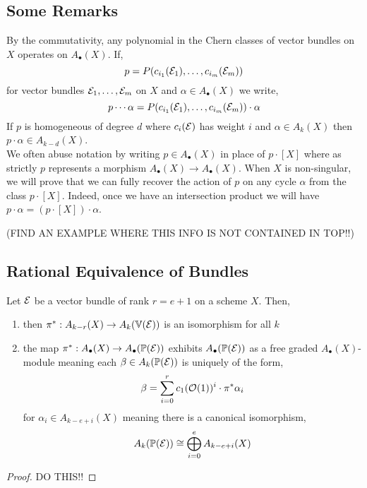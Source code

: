 \documentclass[12pt]{article}
\begin{document}
\subsection{Some Remarks}

By the commutativity, any polynomial in the Chern classes of vector bundles on $X$ operates on $A_\bullet(X)$. If,
\[ p = P(c_{i_1}(\mathcal{E}_1), \dots, c_{i_m}(\mathcal{E}_m)) \]
for vector bundles $\mathcal{E}_1, \dots, \mathcal{E}_m$ on $X$ and $\alpha \in A_\bullet(X)$ we write,
\[ p \cdots \alpha = P(c_{i_1}(\mathcal{E}_1), \dots, c_{i_m}(\mathcal{E}_m)) \cdot \alpha \]
If $p$ is homogeneous of degree $d$ where $c_i(\mathcal{E})$ has weight $i$ and $\alpha \in A_k(X)$ then $p \cdot \alpha \in A_{k-d}(X)$.
\bigskip\\
We often abuse notation by writing $p \in A_\bullet(X)$ in place of $p \cdot [X]$ where as strictly $p$ represents a morphism $A_\bullet(X) \to A_\bullet(X)$. When $X$ is non-singular, we will prove that we can fully recover the action of $p$ on any cycle $\alpha$ from the class $p \cdot [X]$. Indeed, once we have an intersection product we will have $p \cdot \alpha = (p \cdot [X]) \cdot \alpha$. 

(FIND AN EXAMPLE WHERE THIS INFO IS NOT CONTAINED IN TOP!!)

\subsection{Rational Equivalence of Bundles}

\begin{theorem}
Let $\mathcal{E}$ be a vector bundle of rank $r = e + 1$ on a scheme $X$. Then,
\begin{enumerate}
\item then $\pi^* : A_{k-r}(X) \to A_k(\mathbb{V}(\mathcal{E}))$ is an isomorphism for all $k$

\item the map $\pi^* : A_\bullet(X) \to A_\bullet(\mathbb{P}(\mathcal{E}))$ exhibits $A_\bullet(\mathbb{P}(\mathcal{E}))$ as a free graded $A_\bullet(X)$-module meaning each $\beta \in A_k(\mathbb{P}(\mathcal{E}))$ is uniquely of the form,
\[ \beta = \sum_{i = 0}^r c_1(\mathcal{O}_{}(1))^i \cdot \pi^* \alpha_i \]
for $\alpha_i \in A_{k - e + i}(X)$ meaning there is a canonical isomorphism,
\[ A_k(\mathbb{P}(\mathcal{E})) \cong \bigoplus_{i = 0}^e A_{k-e+i}(X) \]
\end{enumerate}
\end{theorem}

\begin{proof}
DO THIS!!
\end{proof}
\end{document}
